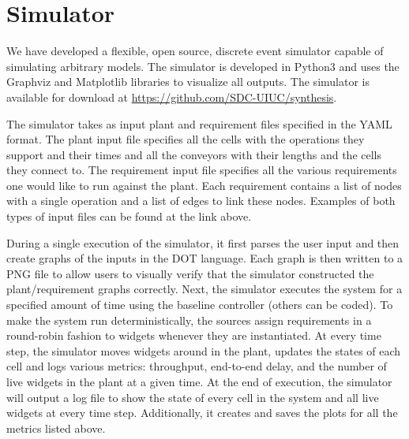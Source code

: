 \section{\mfname Simulator}
\label{sec:simulation}

We have developed a flexible, open source, discrete event simulator capable of simulating arbitrary \mfname models. The simulator is developed in Python3 and uses the Graphviz and Matplotlib libraries to visualize all outputs. The simulator is available for download at \url{https://github.com/SDC-UIUC/synthesis}.

The \mfname simulator takes as input plant and requirement files specified in the YAML format. The plant input file specifies all the cells with the operations they support and their times and all the conveyors with their lengths and the cells they connect to. The requirement input file specifies all the various requirements one would like to run against the plant. Each requirement contains a list of nodes with a single operation and a list of edges to link these nodes. Examples of both types of input files can be found at the link above. 

During a single execution of the simulator, it first parses the user input and then create graphs of the inputs in the DOT language. Each graph is then written to a PNG file to allow users to visually verify that the simulator constructed the plant/requirement graphs correctly. Next, the simulator executes the system for a specified amount of time using the baseline controller (others can be coded). To make the system run deterministically, the sources assign requirements in a round-robin fashion to widgets whenever they are instantiated. At every time step, the simulator moves widgets around in the plant, updates the states of each cell and logs various metrics: throughput, end-to-end delay, and the number of live widgets in the plant at a given time. At the end of execution, the simulator will output a log file to show the state of every cell in the system and all live widgets at every time step. Additionally, it creates and saves the plots for all the metrics listed above.